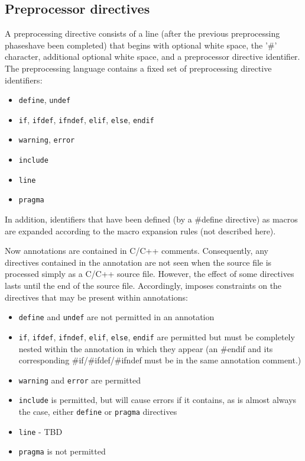 \subsection{Preprocessor directives}
A preprocessing directive consists of a line (after the previous preprocessing phaseshave been completed) that begins with optional white space, the '\#' character, additional optional white space, and a preprocessor directive identifier.
The preprocessing language contains a fixed set of preprocessing directive identifiers:
\begin{itemize}
	\item \texttt{define}, \texttt{undef}
	\item \texttt{if}, \texttt{ifdef}, \texttt{ifndef}, \texttt{elif}, \texttt{else}, \texttt{endif}
	\item \texttt{warning}, \texttt{error}
	\item \texttt{include}
	\item \texttt{line}
	\item \texttt{pragma}
\end{itemize}
In addition, identifiers that have been defined (by a \#define directive) as macros are expanded according to the macro expansion rules (not described here).

Now \acslb annotations are contained in C/C++ comments. 
Consequently, any directives contained in the annotation are not seen when the source file is processed simply as a C/C++ source file. However, the effect of some directives lasts until the end of the source file. 
Accordingly, \acslpp imposes constraints on the directives that may be present within annotations:
\begin{itemize}
	\item \texttt{define} and \texttt{undef} are not permitted in an annotation
	\item \texttt{if}, \texttt{ifdef}, \texttt{ifndef}, \texttt{elif}, \texttt{else}, \texttt{endif} are permitted but must be completely nested within the annotation in which they appear (an \#endif and its corresponding \#if/\#ifdef/\#ifndef must be in the same annotation comment.)
	\item \texttt{warning} and \texttt{error} are permitted
	\item \texttt{include} is permitted, but will cause errors if it contains, as is almost always the case, either \texttt{define} or \texttt{pragma} directives
	\item \texttt{line} - TBD
	\item \texttt{pragma} is not permitted
\end{itemize}



